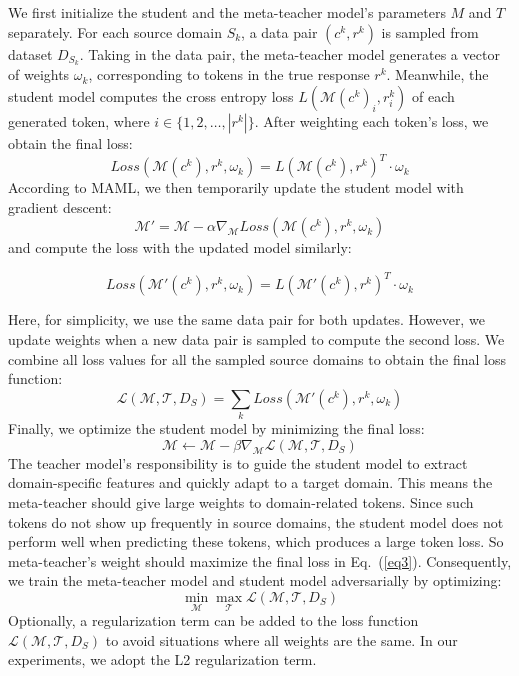 \documentclass[letterpaper]{article} %
\begin{document}
We first initialize the student and the meta-teacher model's parameters $M$ and $T$ separately.
For each source domain $S_k$, a data pair $(c^k,{r}^k)$ is sampled from dataset $D_{S_k}$.
Taking in the data pair, the meta-teacher model generates a  vector of weights $\omega_k$, corresponding to tokens in the true response ${r}^k$.
%
Meanwhile, the student model computes the cross entropy loss ${\mathit{L}(\mathcal{M}(c^k)_i,{r}_i^k)}$ of each generated token, where $i\in\{1,2,\dots,|{r}^k|\}$.
After weighting each token's loss, we obtain the final loss:
$$Loss(\mathcal{M}( c^k),{r}^k,\omega_k)={\mathit{L}(\mathcal{M}(c^k),{r}^k)}^T\cdot \omega_k$$
According to MAML, we then temporarily update the student model with gradient descent:
$$\mathcal{M}'=\mathcal{M}-\alpha \nabla_{\mathcal{M}}Loss(\mathcal{M}(c^k), {r}^k, \omega_k)$$
and compute the loss with the updated model similarly:

$$Loss(\mathcal{M'}(c^k),{r}^k,\omega_k)={\mathit{L}(\mathcal{M'}(c^k),{r}^k)}^T\cdot \omega_k$$

Here, for simplicity, we use the same data pair for both updates. However, we update weights when a new data pair is sampled to compute the second loss.
%
We combine all loss values for all the sampled source domains to obtain the final loss function:
\begin{equation}\label{eq3}
\mathscr{L}(\mathcal{M},\mathcal{T}, D_S)=\sum_k \mathit{Loss}(\mathcal{M}'( c^k), {r}^k, \omega_k)
\end{equation}
Finally, we optimize the student model by minimizing the final loss:
$$\mathcal{M} \leftarrow \mathcal{M} - \beta \nabla_{\mathcal{M}} \mathscr{L}(\mathcal{M},\mathcal{T}, D_S)$$
The teacher model's responsibility is to guide the student model to extract domain-specific features and quickly adapt to a target domain.
This means the meta-teacher should give large weights to domain-related tokens. Since such tokens do not show up frequently in source domains, the student model does not perform well when predicting these tokens, which produces a large token loss.
So meta-teacher's weight should maximize the final loss in Eq.~(\ref{eq3}).
Consequently, we train the meta-teacher model and student model adversarially by optimizing:
$$\min_{\mathcal{M}}\max_{\mathcal{T}}\mathscr{L}(\mathcal{M},\mathcal{T}, D_S)$$
Optionally, a regularization term can be added to the loss function $\mathscr{L}(\mathcal{M},\mathcal{T}, D_S)$ to avoid situations where all weights are the same. In our experiments, we adopt the L2 regularization term.
\end{document}
